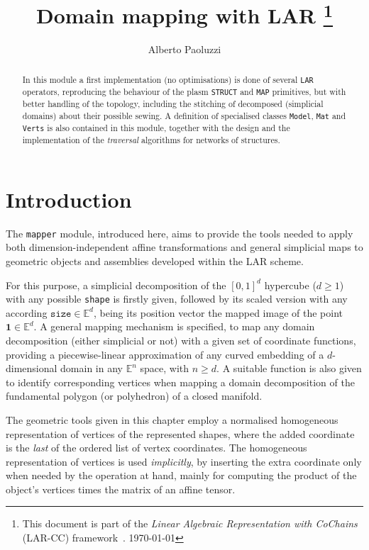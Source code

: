 \documentclass[11pt,oneside]{article}	%
\title{Domain mapping with LAR
\footnote{This document is part of the \emph{Linear Algebraic Representation with CoChains} (LAR-CC) framework~\cite{cclar-proj:2013:00}. \today}
}
\author{Alberto Paoluzzi}
\def\E{\mathbb{E}}
\begin{document}
\maketitle
\nonstopmode

\begin{abstract}
In this module a first implementation (no optimisations) is done of several \texttt{LAR} operators, reproducing the behaviour of the plasm  \texttt{STRUCT} and \texttt{MAP} primitives, but with better handling of the topology, including the stitching of decomposed (simplicial domains) about their possible sewing. A definition of specialised classes \texttt{Model}, \texttt{Mat} and \texttt{Verts} is also contained in this module, together with the design and the implementation of the \emph{traversal} algorithms for networks of structures.
\end{abstract}

\tableofcontents

\section{Introduction}

The \texttt{mapper} module, introduced here, aims to provide the tools needed to apply both dimension-independent affine transformations and general simplicial maps to geometric objects and assemblies developed within the LAR scheme. 

For this purpose, a simplicial decomposition of the $[0,1]^d$ hypercube ($d \geq 1$) with any possible \texttt{shape} is firstly given, followed by its scaled version with any  according $\texttt{size}\in\E^d$, being its position vector the mapped image of the point $\mathbf{1}\in\E^d$. A general mapping mechanism is specified, to map any domain decomposition (either simplicial or not) with a given set of coordinate functions, providing a piecewise-linear approximation of any curved embedding of a $d$-dimensional domain in any $\E^n$ space, with $n \geq d$. 
A suitable function is also given to identify corresponding vertices when mapping a domain decomposition of the fundamental polygon (or polyhedron) of a closed manifold. 

The geometric tools given in this chapter employ a normalised homogeneous representation of vertices of the represented shapes, where the added coordinate is the \emph{last} of the ordered list of vertex coordinates. The homogeneous representation of vertices is used \emph{implicitly}, by inserting the extra coordinate only when needed by the operation at hand, mainly for computing the product of the object's vertices times the matrix of an affine tensor. 
\end{document}
